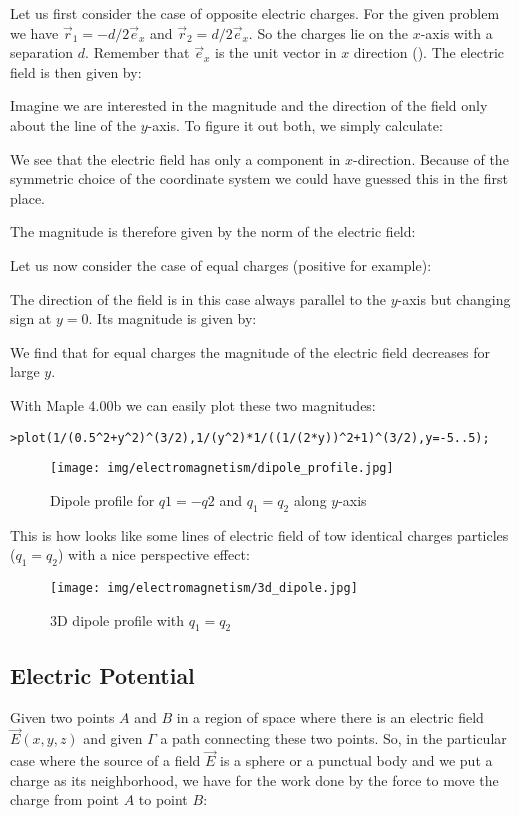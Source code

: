	Let us first consider the case of opposite electric charges. For the given problem we have $\vec{r}_1=-d/2\vec{e}_x$ and $\vec{r}_2=d/2\vec{e}_x$. So the charges lie on the $x$-axis with a separation $d$. Remember that $\vec{e}_x$ is the unit vector in $x$ direction (). The electric field is then given by:
	
	Imagine we are interested in the magnitude and the direction of the field only about the line of the $y$-axis. To figure it out both, we simply calculate:
	
	We see that the electric field has only a component in $x$-direction. Because of the symmetric choice of the coordinate system we could have guessed this in the first place.
	
	The magnitude is therefore given by the norm of the electric field:
	
	Let us now consider the case of equal charges (positive for example):
	
	The direction of the field is in this case always parallel to the $y$-axis but changing sign at $y=0$. Its magnitude is given by:
	
	We find that for equal charges the magnitude of the electric field decreases for large $y$.
	
	With Maple 4.00b we can easily plot these two magnitudes:
	
	\texttt{>plot({1/(0.5\string^2+y\string^2)\string^(3/2),1/(y\string^2)*1/((1/(2*y))\string^2+1)\string^(3/2)},y=-5..5);}
	\begin{figure}[H]
		\centering
		\texttt{[image: img/electromagnetism/dipole\_profile.jpg]}
		\caption{Dipole profile for $q1=-q2$ and $q_1=q_2$ along $y$-axis}
	\end{figure}
	This is how looks like some lines of electric field of tow identical charges particles ($q_1=q_2$) with a nice perspective effect:
	\begin{figure}[H]
		\centering
		\texttt{[image: img/electromagnetism/3d\_dipole.jpg]}
		\caption{3D dipole profile with $q_1=q_2$}
	\end{figure}
	
	\pagebreak
	\subsection{Electric Potential}
	 Given two points $A$ and $B$ in a region of space where there is an electric field $\vec{E}(x,y,z)$ and given $\Gamma$ a path connecting these two points. So, in the particular case where the source of a field $\vec{E}$ is a sphere or a punctual body and we put  a charge as its neighborhood, we have for the work done by the force to move the charge from point $A$ to point $B$:
	 
